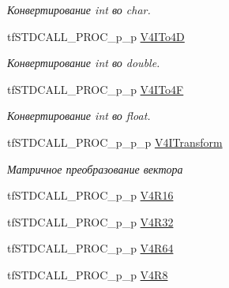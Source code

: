 \begin{DoxyCompactItemize}
\begin{DoxyCompactList}\small\item\em Конвертирование int во char. \end{DoxyCompactList}\item 
\hypertarget{structs_functions_vector_c_p_u_a26ed1ae2a158b5baa84d99fbeaaf7525}{tf\-S\-T\-D\-C\-A\-L\-L\-\_\-\-P\-R\-O\-C\-\_\-p\-\_\-p \hyperlink{structs_functions_vector_c_p_u_a26ed1ae2a158b5baa84d99fbeaaf7525}{V4\-I\-To4\-D}}\label{structs_functions_vector_c_p_u_a26ed1ae2a158b5baa84d99fbeaaf7525}

\begin{DoxyCompactList}\small\item\em Конвертирование int во double. \end{DoxyCompactList}\item 
\hypertarget{structs_functions_vector_c_p_u_a25cfec0dae3c588f985b72ee43500829}{tf\-S\-T\-D\-C\-A\-L\-L\-\_\-\-P\-R\-O\-C\-\_\-p\-\_\-p \hyperlink{structs_functions_vector_c_p_u_a25cfec0dae3c588f985b72ee43500829}{V4\-I\-To4\-F}}\label{structs_functions_vector_c_p_u_a25cfec0dae3c588f985b72ee43500829}

\begin{DoxyCompactList}\small\item\em Конвертирование int во float. \end{DoxyCompactList}\item 
\hypertarget{structs_functions_vector_c_p_u_aca2d2abec2332207e0043a87e69f5e62}{tf\-S\-T\-D\-C\-A\-L\-L\-\_\-\-P\-R\-O\-C\-\_\-p\-\_\-p\-\_\-p \hyperlink{structs_functions_vector_c_p_u_aca2d2abec2332207e0043a87e69f5e62}{V4\-I\-Transform}}\label{structs_functions_vector_c_p_u_aca2d2abec2332207e0043a87e69f5e62}

\begin{DoxyCompactList}\small\item\em Матричное преобразование вектора \end{DoxyCompactList}\item 
tf\-S\-T\-D\-C\-A\-L\-L\-\_\-\-P\-R\-O\-C\-\_\-p\-\_\-p \hyperlink{structs_functions_vector_c_p_u_aa90bde2471f5954f352d9acb9cef54f9}{V4\-R16}
\item 
tf\-S\-T\-D\-C\-A\-L\-L\-\_\-\-P\-R\-O\-C\-\_\-p\-\_\-p \hyperlink{structs_functions_vector_c_p_u_a93152820779380ede229262f657021f7}{V4\-R32}
\item 
tf\-S\-T\-D\-C\-A\-L\-L\-\_\-\-P\-R\-O\-C\-\_\-p\-\_\-p \hyperlink{structs_functions_vector_c_p_u_aa1360a92c2ef1b159225f0643172b37e}{V4\-R64}
\item 
tf\-S\-T\-D\-C\-A\-L\-L\-\_\-\-P\-R\-O\-C\-\_\-p\-\_\-p \hyperlink{structs_functions_vector_c_p_u_a82ae1f9d36d03fd79f93301f040fa726}{V4\-R8}
\end{DoxyCompactItemize}


